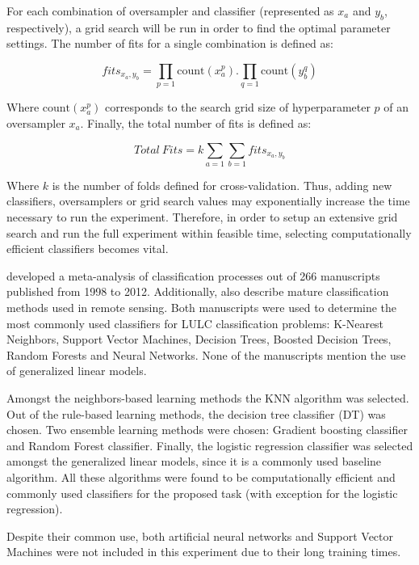 \documentclass[parskip=full]{scrartcl}
\begin{document}
For each combination of oversampler and classifier (represented as $x_a$ and
$y_b$, respectively), a grid search will be run in order to find the optimal
parameter settings. The number of fits for a single combination  is defined as:

\begin{equation}
fits_{x_a,y_b}=\prod\limits_{p=1} \textrm{count}(x_a^p).\prod\limits_{q=1}
\textrm{count}(y_b^q)
\end{equation}

Where $\textrm{count}(x_a^p)$ corresponds to the search grid size of
hyperparameter $p$ of an oversampler $x_a$. Finally, the total number of fits is
defined as:

\begin{equation}
Total\ Fits=k\sum\limits_{a=1} \sum\limits_{b=1} fits_{x_a,y_b}
\end{equation}

Where $k$ is the number of folds defined for cross-validation. Thus, adding new
classifiers, oversamplers or grid search values may exponentially increase the
time necessary to run the experiment. Therefore, in order to setup an extensive
grid search and run the full experiment within feasible time, selecting
computationally efficient classifiers becomes vital.

\cite{Khatami2016} developed a meta-analysis of classification processes out of
266 manuscripts published from 1998 to 2012. Additionally, \cite{Maxwell2018}
also describe mature classification methods used in remote sensing. Both
manuscripts were used to determine the most commonly used classifiers for LULC
classification problems: K-Nearest Neighbors, Support Vector Machines, Decision
Trees, Boosted Decision Trees, Random Forests and Neural Networks. None of the
manuscripts mention the use of generalized linear models.

Amongst the neighbors-based learning methods the KNN algorithm was selected. Out
of the rule-based learning methods, the decision tree classifier (DT) was
chosen. Two ensemble learning methods were chosen: Gradient boosting classifier
and Random Forest classifier. Finally, the logistic regression classifier was
selected amongst the generalized linear models, since it is a commonly used
baseline algorithm. All these algorithms were found to be computationally
efficient and commonly used classifiers for the proposed task (with exception
for the logistic regression).

Despite their common use, both artificial neural networks and Support Vector
Machines were not included in this experiment due to their long training times.
\end{document}
